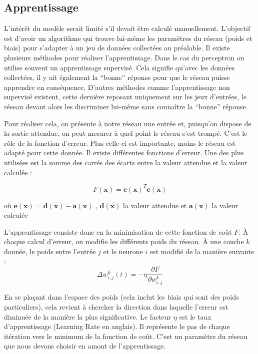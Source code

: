 \subsection{Apprentissage}

L'intérêt du modèle serait limité s'il devait être calculé manuellement. L'objectif est d'avoir un algorithme qui trouve lui-même les paramètres du réseau
(poids et biais) pour s'adapter à un jeu de données collectées au préalable. Il existe plusieurs méthodes pour réaliser l'apprentissage. Dans le cas du 
perceptron on utilise souvent un apprentissage supervisé. Cela signifie qu'avec les données collectées, il y ait également la ``bonne'' réponse pour que 
le réseau puisse apprendre en conséquence. D'autres méthodes comme l'apprentissage non supervisé existent, cette dernière reposant uniquement sur les jeux 
d'entrées, le réseau devant alors les discriminer lui-même sans connaître la ``bonne'' réponse.

Pour réaliser cela, on présente à notre réseau une entrée et, puisqu'on dispose de la sortie attendue, on peut mesurer à quel point le réseau s'est trompé.
C'est le rôle de la fonction d'erreur. Plus celle-ci est importante, moins le réseau est adapté pour cette donnée. Il existe différentes fonctions
d'erreur. Une des plus utilisées est la somme des carrés des écarts entre la valeur attendue et la valeur calculée : 

\begin{equation}
\displaystyle F\left(\mathbf{x}\right) = \mathbf{e\left(x\right)}^T\mathbf{e\left(x\right)} 
\end{equation}

où $\displaystyle \mathbf{e\left(x\right)} = \mathbf{d\left(x\right)} - \mathbf{a\left(x\right)} $ ,
$\mathbf{d\left(x\right)}$ la valeur attendue et $\mathbf{a\left(x\right)}$ la valeur calculée


L'apprentissage consiste donc en la minimisation de cette fonction de coût $F$. À chaque calcul d'erreur, on modifie les différents poids du réseau.
À une couche $k$ donnée, le poids entre l'entrée $j$ et le neurone $i$ est modifié de la manière suivante : 
\begin{equation}
 \Delta w^k_{i,j}\left(t\right) = - \eta \frac{\partial F}{\partial w^k_{i,j}}
\end{equation}
 
En se plaçant dans l'espace des poids (cela inclut les biais qui sont des poids particuliers), cela revient à chercher la direction dans laquelle l'erreur
est diminuée de la manière la plus significative. Le facteur $\eta$ est le taux d'apprentissage (Learning Rate en anglais). Il représente le pas de
chaque itération vers le minimum de la fonction de coût. C'est un paramètre du réseau que nous devons choisir en amont de l'apprentissage.

